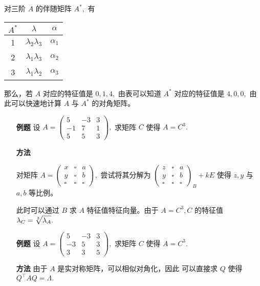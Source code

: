 \begin{enumerate}
    对三阶 $ A $ 的伴随矩阵 $ A^*, $ 有
    \begin{table}[!htbp]\centering
        \begin{tabular}{ccc}
        \toprule
        $ A^* $ & $ \lambda $ & $ \alpha $  \\ \midrule
        1 & $ \lambda_2\lambda_3 $ & $ \alpha_1 $  \\
        2 & $ \lambda_1\lambda_3 $ & $ \alpha_2 $  \\
        3 & $ \lambda_1\lambda_2 $ & $ \alpha_3 $  \\ \bottomrule
        \end{tabular}
    \end{table}

    那么，若 $ A $ 对应的特征值是 $ 0,1,4, $ 由表可以知道
    $ A^* $ 对应的特征值是 $ 4,0,0, $ 由此可以快速地计算
    $ A $ 与 $ A^* $ 的对角矩阵。
\end{enumerate}

\begin{enumerate}
    \item[\textbf{例题}]
    设 $ A = \begin{pmatrix}
        5&-3&3\\-1&7&1\\5&5&3
    \end{pmatrix}, $ 求矩阵 $ C $ 使得 $ A = C^3. $ 
    \item[\textbf{方法}] 
    
    对矩阵 $ A = \begin{pmatrix}
        x&\square&a\\y&\square&b\\\square&\square&\square
    \end{pmatrix}, $ 
    尝试将其分解为 $ \begin{pmatrix}
        z&\square&a\\y&\square&b\\\square&\square&\square
    \end{pmatrix}_B + kE $ 使得 $ z,y $ 与 $ a,b $ 等比例。

    此时可以通过 $ B $ 求 $ A $ 特征值特征向量。由于 $ A = C^3, C $ 的特征值 $ \lambda_C = \displaystyle\sqrt[3]{\lambda_A}. $ 
\end{enumerate}

\begin{enumerate}
    \item[\textbf{例题}]
    设 $ A = \begin{pmatrix}
        5&-3&3\\-3&5&3\\3&3&5
    \end{pmatrix}, $ 求矩阵 $ C $ 使得 $ A = C^3. $
    \item[\textbf{方法}] 
    由于 $ A $ 是实对称矩阵，可以相似对角化，因此
    可以直接求 $ Q $ 使得 $ Q^\top AQ = \Lambda. $ 
\end{enumerate}